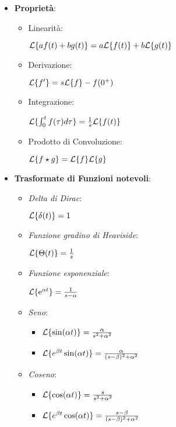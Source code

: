 \begin{itemize}

\item{\textbf{Proprietà}}:

\begin{itemize}

\item{Linearità}:

$\mathcal{L}\{af(t) + bg(t)\} = a\mathcal{L}\{f(t)\} + b\mathcal{L}\{g(t)\}$

\item{Derivazione}: 

$\mathcal{L}\{f'\} = s\mathcal{L}\{f\} - f(0^+)$

\item{Integrazione}:

$\mathcal{L}\{\int_0^t{f(\tau)d\tau}\} = \frac{1}{s}\mathcal{L}\{f(t)\}$

\item{Prodotto di Convoluzione}:

$\mathcal{L}\{f\star g\} = \mathcal{L}\{f\}\mathcal{L}\{g\}$

\end{itemize}

\item{\textbf{Trasformate di Funzioni notevoli}}:

\begin{itemize}

\item{\textit{Delta di Dirac}}:

$\mathcal{L}\{\delta(t)\} = 1$

\item{\textit{Funzione gradino di Heaviside}}:

$\mathcal{L}\{\Theta(t)\} = \frac{1}{s}$

\item{\textit{Funzione esponenziale}}:

$\mathcal{L}\{\mathop{}\!\mathrm{e}^{\alpha t}\} = \frac{1}{s-\alpha}$

\item{\textit{Seno}}:

\begin{itemize}

\item $\mathcal{L}\{\sin(\alpha t)\} = \frac{\alpha}{s^2+\alpha^2}$
\item $\mathcal{L}\{e^{\beta t}\sin(\alpha t)\} = \frac{\alpha}{(s-\beta)^2 + \alpha^2}$

\end{itemize}

\item{\textit{Coseno}}:

\begin{itemize}

\item $\mathcal{L}\{\cos(\alpha t)\} = \frac{s}{s^2+\alpha^2}$
\item $\mathcal{L}\{e^{\beta t}\cos(\alpha t)\} = \frac{s-\beta}{(s-\beta)^2 + \alpha^2}$

\end{itemize}

\end{itemize}

\end{itemize}

